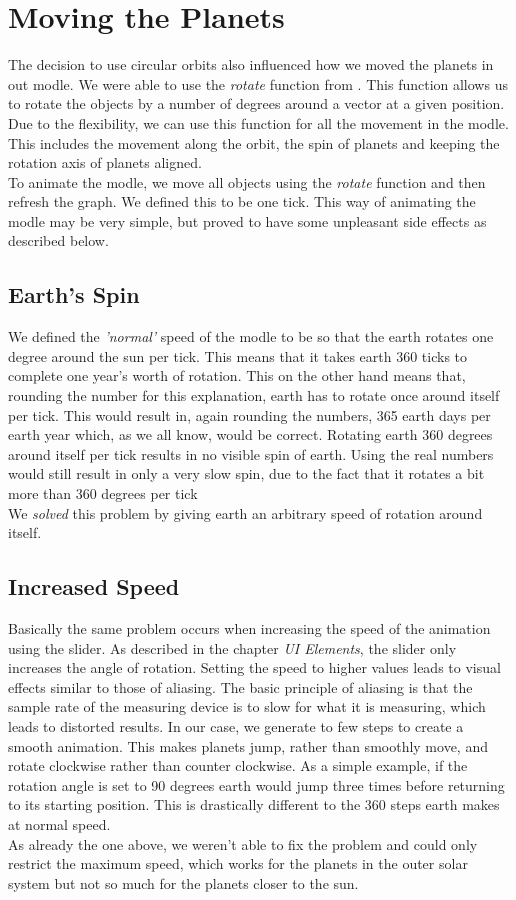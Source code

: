 \chapter{Moving the Planets}
The decision to use circular orbits also influenced how we moved the planets in out modle. We were able to use the {\em rotate} function from \matlab{}. This function allows us to rotate the objects by a number of degrees around a vector at a given position. Due to the flexibility, we can use this function for all the movement in the modle. This includes the movement along the orbit, the spin of planets and keeping the rotation axis of planets aligned.\\

To animate the modle, we move all objects using the {\em rotate} function and then refresh the graph. We defined this to be one tick. This way of animating the modle may be very simple, but proved to have some unpleasant side effects as described below.

\section{Earth's Spin}
We defined the {\em 'normal'} speed of the modle to be so that the earth rotates one degree around the sun per tick. This means that it takes earth 360 ticks to complete one year's worth of rotation. This on the other hand means that, rounding the number for this explanation, earth has to rotate once around itself per tick. This would result in, again rounding the numbers, 365 earth days per earth year which, as we all know, would be correct. Rotating earth 360 degrees around itself per tick results in no visible spin of earth. Using the real numbers would still result in only a very slow spin, due to the fact that it rotates a bit more than 360 degrees per tick\\

We {\em solved} this problem by giving earth an arbitrary speed of rotation around itself.


\section{Increased Speed}
Basically the same problem occurs when increasing the speed of the animation using the slider. As described in the chapter {\em UI Elements}, the slider only increases the angle of rotation. Setting the speed to higher values leads to visual effects similar to those of aliasing. The basic principle of aliasing is that the sample rate of the measuring device is to slow for what it is measuring, which leads to distorted results. In our case, we generate to few steps to create a smooth animation. This makes planets jump, rather than smoothly move, and rotate clockwise rather than counter clockwise. As a simple example, if  the rotation angle is set to 90 degrees earth would jump three times before returning to its starting position. This is drastically different to the 360 steps earth makes at normal speed. \\

As already the one above, we weren't able to fix the problem and could only restrict the maximum speed, which works for the planets in the outer solar system but not so much for the planets closer to the sun.